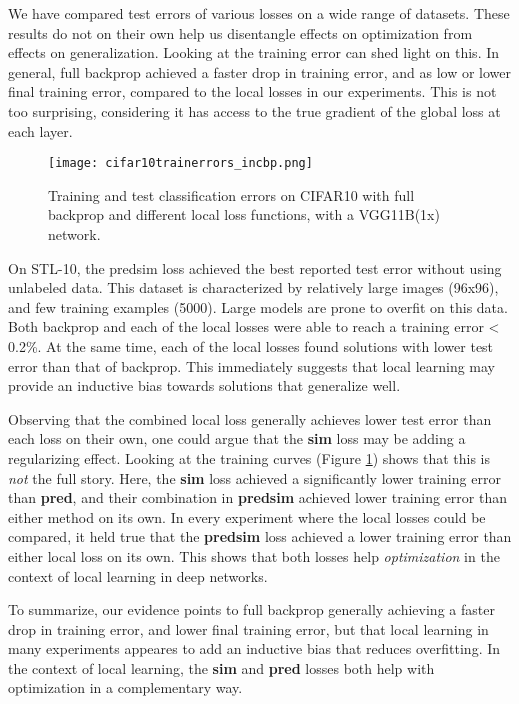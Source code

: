 \documentclass{article}
\begin{document}
We have compared test errors of various losses on a wide range of datasets. These results do not on their own help us disentangle effects on optimization from effects on generalization. Looking at the training error can shed light on this. In general, full backprop achieved a faster drop in training error, and as low or lower final training error, compared to the local losses in our experiments. This is not too surprising, considering it has access to the true gradient of the global loss at each layer. 

\begin{figure}[h]
  \texttt{[image: cifar10trainerrors\_incbp.png]}
  \caption{Training and test classification errors on CIFAR10 with full backprop and different local loss functions, with a VGG11B(1x) network.}
  \label{fig:cifar10trainerrors}
\end{figure}

On STL-10, the predsim loss achieved the best reported test error without using unlabeled data. This dataset is characterized by relatively large images (96x96), and few training examples (5000). Large models are prone to overfit on this data. Both backprop and each of the local losses were able to reach a training error < 0.2\%. At the same time, each of the local losses found solutions with lower test error than that of backprop. This immediately suggests that local learning may provide an inductive bias towards solutions that generalize well.

Observing that the combined local loss generally achieves lower test error than each loss on their own, one could argue that the \textbf{sim} loss may be adding a regularizing effect. Looking at the training curves (Figure \ref{fig:cifar10trainerrors}) shows that this is \textit{not} the full story. Here, the \textbf{sim} loss achieved a significantly lower training error than \textbf{pred}, and their combination in \textbf{predsim} achieved lower training error than either method on its own. In every experiment where the local losses could be compared, it held true that the \textbf{predsim} loss achieved a lower training error than either local loss on its own. This shows that both losses help \textit{optimization} in the context of local learning in deep networks.

To summarize, our evidence points to full backprop generally achieving a faster drop in training error, and lower final training error, but that local learning in many experiments appeares to add an inductive bias that reduces overfitting. In the context of local learning, the \textbf{sim} and \textbf{pred} losses both help with optimization in a complementary way. 
\end{document}
